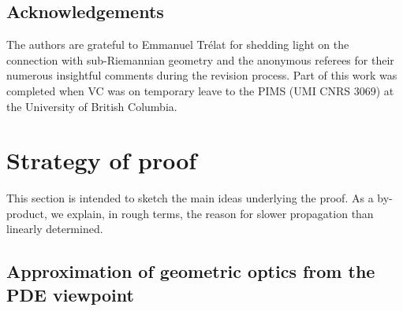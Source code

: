\documentclass[AHL,Unicode,longabstracts]{cedram}
\newcommand{\1}{\mathds{1}}
\begin{document}
\subsection*{Acknowledgements}
The authors are grateful to Emmanuel Trélat for shedding light on the connection with sub-Riemannian geometry and the anonymous referees for their numerous insightful comments during the revision process. Part of this work was completed when VC was on temporary leave to the PIMS (UMI CNRS 3069) at the University of British Columbia.



\section{Strategy of proof}\label{sec:strategy}

This section is intended to sketch the main ideas underlying the proof. As a by-product, we explain, in rough terms, the reason for slower propagation than linearly determined.


\subsection*{Approximation of geometric optics from the PDE viewpoint}
\end{document}
